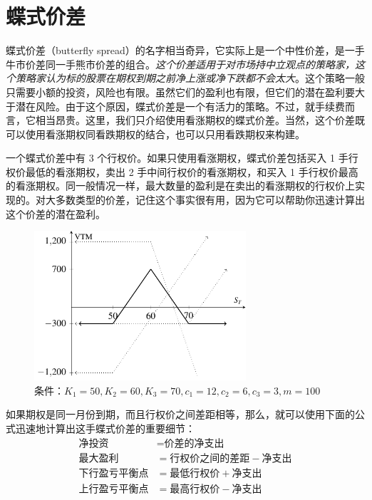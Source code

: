 \chapter{蝶式价差}
蝶式价差（butterfly spread）的名字相当奇异，它实际上是一个中性价差，是一手牛市价差同一手熊市价差的组合。\textit{这个价差适用于对市场持中立观点的策略家，这个策略家认为标的股票在期权到期之前净上涨或净下跌都不会太大}。这个策略一般只需要小额的投资，风险也有限。虽然它们的盈利也有限，但它们的潜在盈利要大于潜在风险。由于这个原因，蝶式价差是一个有活力的策略。不过，就手续费而言，它相当昂贵。这里，我们只介绍使用看涨期权的蝶式价差。当然，这个价差既可以使用看涨期权同看跌期权的结合，也可以只用看跌期权来构建。

一个蝶式价差中有 3 个行权价。如果只使用看涨期权，蝶式价差包括买入 1 手行权价最低的看涨期权，卖出 2 手中间行权价的看涨期权，和买入 1 手行权价最高的看涨期权。同一般情况一样，最大数量的盈利是在卖出的看涨期权的行权价上实现的。对大多数类型的价差，记住这个事实很有用，因为它可以帮助你迅速计算出这个价差的潜在盈利。

\begin{figure}[h]
    \centering
    \includegraphics[width=0.7\textwidth]{IMG/pngbutterflyspreads.pdf}
    \caption{条件：$K_1=50, K_2=60, K_3=70, c_1=12, c_2=6, c_3=3, m=100$}
    \label{fig:pngbutterflyspreads}
\end{figure}

如果期权是同一月份到期，而且行权价之间差距相等，那么，就可以使用下面的公式迅速地计算出这手蝶式价差的重要细节：
\begin{equation}
    \begin{aligned}
    \text{净投资}&=\text{价差的净支出}\\
    \text{最大盈利}&=\text{行权价之间的差距}-\text{净支出}\\
    \text{下行盈亏平衡点}&=\text{最低行权价}+\text{净支出}\\
    \text{上行盈亏平衡点}&=\text{最高行权价}-\text{净支出}\\
    \end{aligned}
\end{equation}

